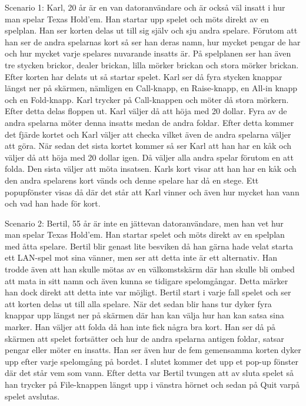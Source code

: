 \documentclass[10pt,a4paper]{article}
\begin{document}
Scenario 1:
Karl, 20 år är en van datoranvändare och är också väl insatt i hur man spelar Texas Hold’em. Han startar upp spelet och möts direkt av en spelplan. Han ser korten delas ut till sig själv och sju andra spelare. Förutom att han ser de andra spelarnas kort så ser han deras namn, hur mycket pengar de har och hur mycket varje spelares nuvarande insatts är. På spelplanen ser han även tre stycken brickor, dealer brickan, lilla mörker brickan och stora mörker brickan. Efter korten har delats ut så startar spelet. Karl ser då fyra stycken knappar längst ner på skärmen, nämligen en Call-knapp, en Raise-knapp, en All-in knapp och en Fold-knapp. Karl trycker på Call-knappen och möter då stora mörkern. Efter detta delas floppen ut. Karl väljer då att höja med 20 dollar. Fyra av de andra spelarna möter denna insatts medan de andra foldar. Efter detta kommer det fjärde kortet och Karl väljer att checka vilket även de andra spelarna väljer att göra. När sedan det sista kortet kommer så ser Karl att han har en kåk och väljer då att höja med 20 dollar igen. Då väljer alla andra spelar förutom en att folda. Den sista väljer att möta insatsen. Karls kort visar att han har en kåk och den andra spelarens kort vänds och denne spelare har då en stege. Ett popupfönster visas då där det står att Karl vinner och även hur mycket han vann och vad han hade för kort.

Scenario 2:
Bertil, 55 år är inte en jättevan datoranvändare, men han vet hur man spelar Texas Hold’em. Han startar spelet och möts direkt av en spelplan med åtta spelare. Bertil blir genast lite besviken då han gärna hade velat starta ett LAN-spel mot sina vänner, men ser att detta inte är ett alternativ. Han trodde även att han skulle mötas av en välkomstskärm där han skulle bli ombed att mata in sitt namn och även kunna se tidigare spelomgångar. Detta märker han dock direkt att detta inte var möjligt. Bertil start i varje fall spelet och ser att korten delas ut till alla spelare. När det sedan blir hans tur dyker fyra knappar upp längst ner på skärmen där han kan välja hur han kan satsa sina marker. Han väljer att folda då han inte fick några bra kort. Han ser då på skärmen att spelet fortsätter och hur de andra spelarna antigen foldar, satsar pengar eller möter en insatts. Han ser även hur de fem gemensamma korten dyker upp efter varje spelomgång på bordet. I slutet kommer det upp et pop-up fönster där det står vem som vann. Efter detta var Bertil tvungen att av sluta spelet så han trycker på File-knappen längst upp i vänstra hörnet och sedan på Quit varpå spelet avslutas.
\end{document}

